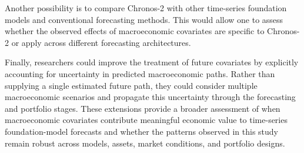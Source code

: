 \documentclass[12pt,a4paper,twoside,openany]{book}
\begin{document}
Another possibility is to compare Chronos-2 with other time-series foundation models and conventional forecasting methods. This would allow one to assess whether the observed effects of macroeconomic covariates are specific to Chronos-2 or apply across different forecasting architectures.

Finally, researchers could improve the treatment of future covariates by explicitly accounting for uncertainty in predicted macroeconomic paths. Rather than supplying a single estimated future path, they could consider multiple macroeconomic scenarios and propagate this uncertainty through the forecasting and portfolio stages. These extensions provide a broader assessment of when macroeconomic covariates contribute meaningful economic value to time-series foundation-model forecasts and whether the patterns observed in this study remain robust across models, assets, market conditions, and portfolio designs.
\end{document}
